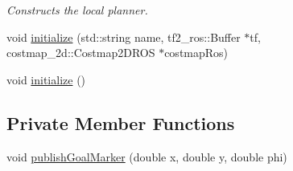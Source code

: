 \begin{DoxyCompactItemize}
\begin{DoxyCompactList}\small\item\em Constructs the local planner. \end{DoxyCompactList}\item 
void \hyperlink{classcl__move__base__z_1_1pure__spinning__local__planner_1_1PureSpinningLocalPlanner_ab28ef2ff04e7ec2b74068ea0fe3351d6}{initialize} (std\+::string name, tf2\+\_\+ros\+::\+Buffer $\ast$tf, costmap\+\_\+2d\+::\+Costmap2\+D\+R\+OS $\ast$costmap\+Ros)
\item 
void \hyperlink{classcl__move__base__z_1_1pure__spinning__local__planner_1_1PureSpinningLocalPlanner_a12fc5253f53f66e3e9735a72ebc9343f}{initialize} ()
\end{DoxyCompactItemize}
\subsection*{Private Member Functions}
\begin{DoxyCompactItemize}
\item 
void \hyperlink{classcl__move__base__z_1_1pure__spinning__local__planner_1_1PureSpinningLocalPlanner_acbabe6590b2d5fc90275180ac09db43e}{publish\+Goal\+Marker} (double x, double y, double phi)
\end{DoxyCompactItemize}
